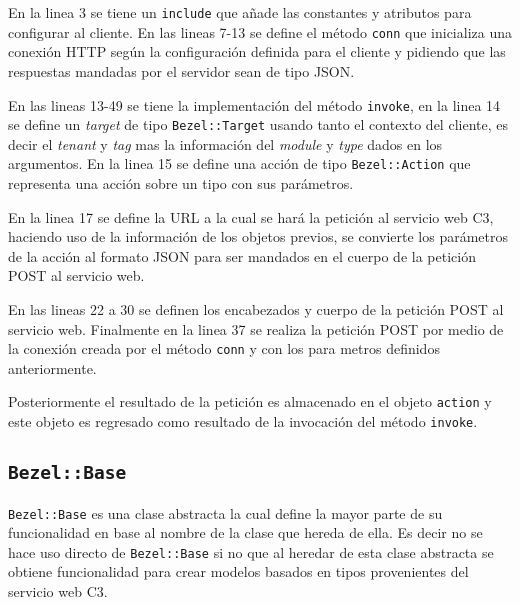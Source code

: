 

En la linea 3 se tiene un \texttt{include} que añade las constantes
y atributos para configurar al cliente. En las lineas 7-13 se define el método
\texttt{conn} que inicializa una conexión HTTP según la configuración definida
para el cliente y pidiendo que las respuestas mandadas por el servidor
sean de tipo JSON.

En las lineas 13-49 se tiene la implementación del método \texttt{invoke}, en
la linea 14 se define un \textit{target} de tipo \texttt{Bezel::Target} usando
tanto el contexto del cliente, es decir el \textit{tenant} y \textit{tag} mas
la información del \textit{module} y \textit{type} dados en los argumentos.
En la linea 15 se define una acción de tipo \texttt{Bezel::Action} que representa
una acción sobre un tipo con sus parámetros.

En la linea 17 se define la URL a la cual se hará la petición al servicio web C3,
haciendo uso de la información de los objetos previos, se convierte los parámetros
de la acción al formato JSON para ser mandados en el cuerpo de la petición POST
al servicio web.


En las lineas 22 a 30 se definen los encabezados y cuerpo de la petición POST al
servicio web. Finalmente en la linea 37 se realiza la petición POST por medio
de la conexión creada por el método \texttt{conn} y con los para metros definidos
anteriormente.

Posteriormente el resultado de la petición es almacenado en el objeto \texttt{action}
y este objeto es regresado como resultado de la invocación del método
\texttt{invoke}.

\subsection{\texttt{Bezel::Base}}

\texttt{Bezel::Base} es una clase abstracta la cual define la mayor parte de su
funcionalidad en base al nombre de la clase que hereda de ella. Es decir no se hace
uso directo de \texttt{Bezel::Base} si no que al heredar de esta clase abstracta
se obtiene funcionalidad para crear modelos basados en tipos provenientes
del servicio web C3.



